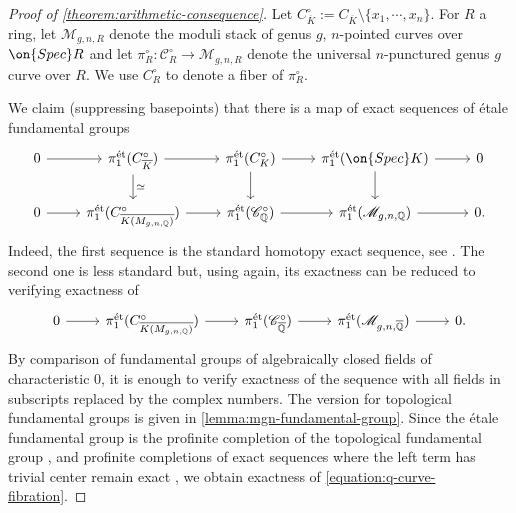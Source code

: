 \documentclass[12 pt]{amsart}
\theoremstyle{plain}
\theoremstyle{definition}
\theoremstyle{remark}
\numberwithin{equation}{section}
\begin{document}
\begin{proof}[Proof of \autoref{theorem:arithmetic-consequence}]
	Let $C^\circ_{\overline K} := 
	C_{\overline{K}}\setminus\{x_1, \cdots, x_n\}$. For $R$ a ring, let $\mathscr
	M_{g,n,R}$ denote the moduli stack of genus $g$, $n$-pointed curves over
	$\on{Spec} R$
	and let $\pi^\circ_R: \mathscr C_R^\circ \to \mathscr M_{g,n,R}$ denote the universal $n$-punctured genus
	$g$ curve over $R$.
	We use $C^\circ_R$ to denote a fiber of $\pi^\circ_R$.

	We claim (suppressing basepoints) that there is a map of exact sequences of \'etale fundamental groups
	\begin{equation}
	\label{equation:map-of-birman-exact-sequences}
	\begin{tikzcd}
	0 \ar {r} & \pi^\text{\'et}_1(C^\circ_{\overline K}) \ar {r} \ar {d}{\simeq} &
	\pi^\text{\'et}_1(C^\circ_K) \ar {r} \ar {d} & \pi^\text{\'et}_1(\on{Spec} K) \ar {r}
	\ar {d} & 0 \\
	0 \ar {r} & \pi^\text{\'et}_1(C^\circ_{\overline {K(M_{g,n,\mathbb Q})}}) \ar {r} &
	\pi^\text{\'et}_1(\mathscr C^\circ_{\mathbb Q}) \ar {r} & \pi^\text{\'et}_1(\mathscr
	M_{g,n,\mathbb Q}) \ar {r} & 0.
	\end{tikzcd}\end{equation}
	Indeed, the first sequence is the standard homotopy exact sequence, see
	\cite[\href{https://stacks.math.columbia.edu/tag/0BTX}{Tag
	0BTX}]{stacks-project}.
	The second one is less standard but, using 
	\cite[\href{https://stacks.math.columbia.edu/tag/0BTX}{Tag
	0BTX}]{stacks-project} again, its exactness
	can be reduced to verifying exactness of
	\begin{equation}
	\label{equation:q-curve-fibration}
	\begin{tikzcd}
	0 \ar {r} &  \pi^\text{\'et}_1(C^\circ_{\overline {K(M_{g,n,\mathbb Q})}}) \ar {r} &
	\pi^\text{\'et}_1(\mathscr C^\circ_{\overline {\mathbb Q}}) \ar {r} & \pi^\text{\'et}_1(\mathscr
	M_{g,n,\overline{ \mathbb Q}}) \ar {r} & 0.
	\end{tikzcd}\end{equation}
	By comparison of fundamental groups of algebraically closed fields of
	characteristic $0$, it is enough to verify exactness of the sequence
	with all fields in subscripts replaced by the complex numbers.
	The version for topological fundamental groups is given in
	\autoref{lemma:mgn-fundamental-group}. Since the \'etale fundamental
	group is the profinite completion of the topological fundamental group
	\cite[Expos\'e XII, Corollaire 5.2]{sga1},
	and profinite completions of exact sequences where the left term has
	trivial center remain exact \cite[Proposition
	3]{anderson:exactness-properties}, we obtain exactness of
	\eqref{equation:q-curve-fibration}.


\end{proof}
\end{document}
